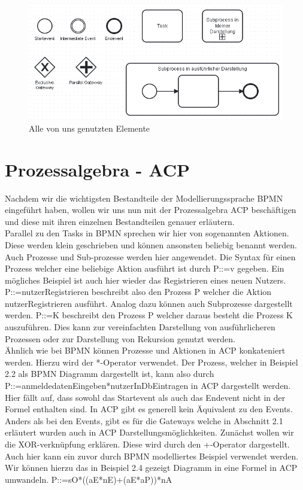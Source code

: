 \begin{figure}
\centering
\includegraphics[scale=0.5]{Figures/Alleblocke}
\decoRule
\caption[Alle Elemente]{Alle von uns genutzten Elemente}
\label{fig:Task}
\end{figure}
\section {Prozessalgebra - ACP}
Nachdem wir die wichtigsten Bestandteile der Modellierungssprache BPMN eingeführt haben, wollen wir uns nun mit der Prozessalgebra ACP beschäftigen und diese mit ihren einzelnen Bestandteilen genauer erläutern.\\
Parallel zu den Tasks in BPMN sprechen wir hier von sogenannten Aktionen. Diese werden klein geschrieben und können ansonsten beliebig benannt werden. Auch Prozesse und Sub-prozesse werden hier angewendet. Die Syntax für einen Prozess welcher eine beliebige Aktion ausführt ist durch P::=v gegeben. Ein mögliches Beispiel ist auch hier wieder das Registrieren eines neuen Nutzers. P::=nutzerRegistrieren beschreibt also den Prozess P welcher die Aktion nutzerRegistrieren ausführt. Analog dazu können auch Subprozesse dargestellt werden. P::=K beschreibt den Prozess P welcher daraus besteht die Prozess K auszuführen. Dies kann zur vereinfachten Darstellung von ausführlicheren Prozessen oder zur Darstellung von Rekursion genutzt werden.\\
Ähnlich wie bei BPMN können Prozesse und Aktionen in ACP konkateniert werden. Hierzu wird der *-Operator verwendet. Der Prozess, welcher in Beispiel 2.2 als BPMN Diagramm dargestellt ist, kann also durch P::=anmeldedatenEingeben*nutzerInDbEintragen in ACP dargestellt werden. Hier fällt auf, dass sowohl das Startevent als auch das Endevent nicht in der Formel enthalten sind. In ACP gibt es generell kein Äquivalent zu den Events.\\
Anders als bei den Events, gibt es für die Gateways welche in Abschnitt 2.1 erläutert wurden auch in ACP Darstellungsmöglichkeiten. Zunächst wollen wir die XOR-verknüpfung erklären. Diese wird durch den +-Operator dargestellt. Auch hier kann ein zuvor durch BPMN modelliertes Beispiel verwendet werden. Wir können hierzu das in Beispiel 2.4 gezeigt Diagramm in eine Formel in ACP umwandeln. P::=sO*((aE*nE)+(aE*aP))*nA\\
